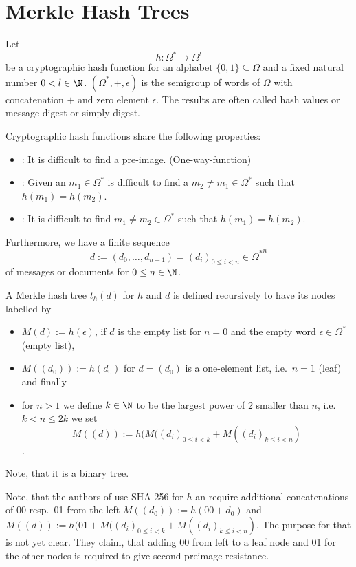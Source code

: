 \section{Merkle Hash Trees}

Let \[h: \Omega^\ast \rightarrow \Omega^l\]
be a cryptographic hash function for an alphabet \(\{0,1\} \subseteq \Omega\) %
and a fixed natural number \(0 < l \in \N\).
\((\Omega^\ast, +, \epsilon)\) is the semigroup of words of
\(\Omega\) with concatenation \(+\) and zero element \(\epsilon\).
The results are often called hash values or message digest or
simply digest.

Cryptographic hash functions share the following properties:
\begin{itemize}
\item {}: It is difficult to find a
pre-image. (One-way-function)
\item {}: Given an \(m_1 \in \Omega^\ast\)
is difficult to find a \(m_2 \ne m_1 \in   \Omega^\ast\) such that
\(h(m_1) = h(m_2)\).
\item {}: It is difficult to find \(m_1 \ne m_2 \in   \Omega^\ast\)
such that \(h(m_1) = h(m_2)\).
\end{itemize}
Furthermore, we have a finite sequence 
\[d := (d_0,\ldots,d_{n-1}) = (d_i)_{0 \le i < n} \in {\Omega^\ast}^n\]
of messages or documents
for \(0 \le n \in \N\).

\begin{definition}
A Merkle hash tree \(t_h(d)\) for \(h\) and \(d\) is defined recursively to 
have its nodes labelled by
\begin{itemize}
\item \(M(d) := h(\epsilon)\), if \(d\) is the empty list for \(n=0\)
and the empty word \(\epsilon \in \Omega^\ast\) (empty list),
\item \(M((d_0)) := h(d_0)\) for \(d = (d_0)\) is a one-element
list, i.e.\ \(n = 1\) (leaf) and finally
\item for \(n > 1\) we define \(k \in \N\) to 
be the largest power of 2 smaller than \(n\), i.e.
\(k < n \le 2k\) we set
\[M((d)) := h(M((d_i)_{0 \le i < k}+M( (d_i)_{k \le i < n})\].
\end{itemize}
Note, that it is a binary tree.
\end{definition}
Note, that the authors of \cite{LLK2013} use SHA-256 for \(h\) an require
additional concatenations of 00 resp.\ 01 from the left \(M((d_0)) := h(00+d_0)\) and
\(M((d)) := h(01+M((d_i)_{0 \le i < k}+M( (d_i)_{k \le i < n})\). The purpose
for that is not yet clear. They claim, that adding 00 from left to a leaf node
and 01 for the other nodes is required to give second preimage resistance.
 
